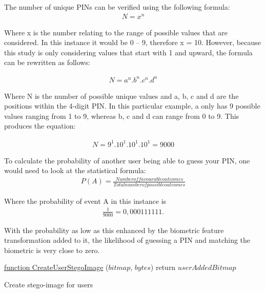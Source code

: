 The number of unique PINs can be verified using the following formula:
\begin{gather}
    N =  x^{n}    
\end{gather}


Where x is the number relating to the range of possible values that are considered. In this instance it would be 0 – 9, therefore x = 10. However, because this study is only considering values that start with 1 and upward, the formula can be rewritten as follows:

\begin{gather}
    N = a^{n}.b^{n}.c^{n}.d^{n}    
\end{gather}


Where N is the number of possible unique values and a, b, c and d are the positions within the 4-digit PIN. In this particular example, a only has 9 possible values ranging from 1 to 9, whereas b, c and d can range from 0 to 9. This produces the equation:

\begin{gather}
    N = 9^{1}.10^{1}.10^{1}.10^{1} 
    = 9000    
\end{gather}



To calculate the probability of another user being able to guess your PIN, one would need to look at the statistical formula: 
\begin{gather}
    P (A) = \frac{Number of favourable outcomes}{Total number of possible outcomes}
\end{gather}


Where the probability of event A in this instance is 
\begin{gather}
    \frac{1}{9000} = 0,000111111.
\end{gather}

With the probability as low as this enhanced by the biometric feature transformation added to it, the likelihood of guessing a PIN and matching the biometric is very close to zero.


\begin{algorithm}
     \underline{function CreateUserStegoImage} ($bitmap$, $bytes$)\;
     return $userAddedBitmap$
     \caption{Create stego-image for users}
     \label{alg: Create stego-image for users}
     
\end{algorithm}

